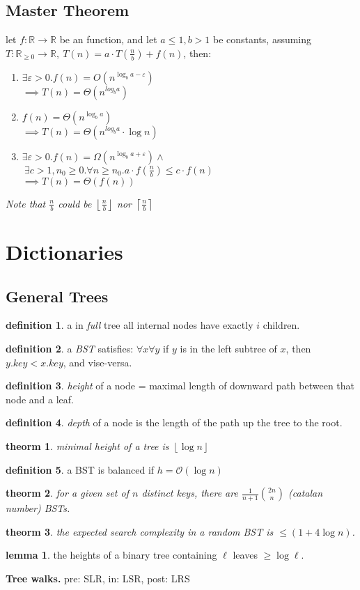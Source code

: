 \documentclass[]{article}
\newcommand\R     {\mathbb{R}}
\newcommand\oc    {\mathcal{O}}
\newcommand\vepsi {\varepsilon}
\newcommand\rc    {\right\rceil}
\newcommand\lc    {\left\lceil}
\newcommand\rf    {\right\rfloor}
\newcommand\lf    {\left\lfloor}
\newcommand\floor [1] {\lf #1 \rf}
\newcommand\logn      {\log n}
\newtheorem{Theorem}{theorm}
\theoremstyle{definition}
\newtheorem{Definition}{definition}
\newtheorem{Lemma}{lemma}
\newcommand\theo  [1] {\begin{Theorem}#1\end{Theorem}}
\newcommand\defi  [1] {\begin{Definition}#1\end{Definition}}
\newcommand\lem   [1] {\begin{Lemma}#1\end{Lemma}}
\begin{document}
\begin{multicols}{4}
		\subsection{Master Theorem}
		let $ f \colon \R \to \R $ be an function, and let $ a \le 1, b >1 $ be constants, assuming $ T \colon \R_{\ge 0} \to \R, \ T(n) = a \cdot T\left (\tfrac{n}{b} \right ) + f(n)$, then: 
		\begin{enumerate}
			\item $ \exists \vepsi > 0. f(n) = O(n^{\log_b a - \vepsi}) $ \\ $\implies T(n) = \Theta(n^{log_b a}) $
			\item $ f(n) = \Theta(n^{\log_b a}) $ \\ $\implies T(n) = \Theta(n^{log_b a} \cdot \logn) $
			\item $ \exists \vepsi > 0. f(n) = \Omega(n^{\log_b a + \vepsi}) \land $ \\
			$\ \exists c>1, n_0 \ge 0. \forall n \ge n_0. a \cdot f(\tfrac{n}{b}) \le c \cdot f(n) $ \\
			$\implies T(n) = \Theta(f(n)) $
		\end{enumerate}
		\textit{Note that $ \mathit{\tfrac{n}{b}} $ could be $ \mathit{\lf \tfrac{n}{b} \rf} $ nor $ \mathit{\lc \tfrac{n}{b} \rc} $}
		
		\section{Dictionaries}
		
		\subsection{General Trees}
		\defi{a in \textit{full} tree all internal nodes have exactly $i$ children. }
		\defi{a \textit{BST} satisfies: $\forall x \forall y$ if $y$ is in the left subtree of $x$, then $y.key < x.key$, and vise-versa. }
		\defi{\textit{height} of a node = maximal length of downward path between that node and a leaf. }
		\defi{\textit{depth} of a node is the length of the path up the tree to the root. }
		\theo{minimal height of a tree is $\floor{\log n}$}
		\defi{a BST is balanced if $h = \oc(\logn)$}
		\theo{for a given set of $n$ distinct keys, there are $\frac{1}{n + 1}\binom{2n}{n}$ (catalan number) BSTs. }
		\theo{the expected search complexity in a random BST is $\le (1 + 4 \logn)$. }
		\lem{the heights of a binary tree containing $\ell$ leaves $\ge \log \ell$. }
		
		\textbf{Tree walks. }pre: SLR, in: LSR, post: LRS
		

\end{multicols}
\end{document}
